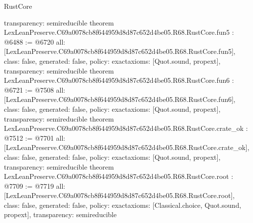 \begin{lexlean}{RustCore}
\begin{coremodule}
{  transparency: semireducible
}
theorem LexLeanPreserve.C69a0078cb8f644959d8d87c652d4be05.R68.RustCore.fun5 : @6488 := @6720 {
  all: [LexLeanPreserve.C69a0078cb8f644959d8d87c652d4be05.R68.RustCore.fun5],
  class: false,
  generated: false,
  policy: exact{axioms: [Quot.sound, propext]},
  transparency: semireducible
}
theorem LexLeanPreserve.C69a0078cb8f644959d8d87c652d4be05.R68.RustCore.fun6 : @6721 := @7508 {
  all: [LexLeanPreserve.C69a0078cb8f644959d8d87c652d4be05.R68.RustCore.fun6],
  class: false,
  generated: false,
  policy: exact{axioms: [Quot.sound, propext]},
  transparency: semireducible
}
theorem LexLeanPreserve.C69a0078cb8f644959d8d87c652d4be05.R68.RustCore.crate_ok : @7512 := @7701 {
  all: [LexLeanPreserve.C69a0078cb8f644959d8d87c652d4be05.R68.RustCore.crate_ok],
  class: false,
  generated: false,
  policy: exact{axioms: [Quot.sound, propext]},
  transparency: semireducible
}
theorem LexLeanPreserve.C69a0078cb8f644959d8d87c652d4be05.R68.RustCore.root : @7709 := @7719 {
  all: [LexLeanPreserve.C69a0078cb8f644959d8d87c652d4be05.R68.RustCore.root],
  class: false,
  generated: false,
  policy: exact{axioms: [Classical.choice, Quot.sound, propext]},
  transparency: semireducible
}


\end{coremodule}
\end{lexlean}
